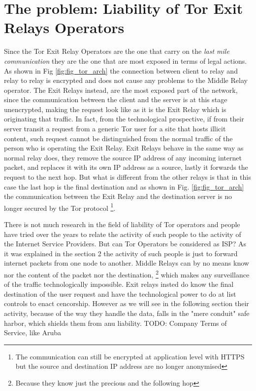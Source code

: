 \documentclass[runningheads,a4paper]{llncs}
\begin{document}
\section{The problem: Liability of Tor Exit Relays Operators}
Since the Tor Exit Relay Operators are the one that carry on the \textit{last mile communication} they are the one that are most exposed in terms of legal actions.
As shown in Fig \ref{fig:fig_tor_arch} the connection between client to relay and relay to relay is encrypted
and does not cause any problems to the Middle Relay operator. The Exit Relays instead, are the most exposed part of the network, since the communication between
the client and the server is at this stage unencrypted, making the request look like as it is the 
Exit Relay which is originating that traffic. 
In fact, from the technological prospective, if from their server transit a request from a generic Tor user for a site that hosts illicit content, such request cannot be distinguished from the normal traffic of the person who is operating the Exit Relay. 
Exit Relays behave in the same way as normal relay does, they remove the source IP address of any incoming internet packet, and replaces it with its own IP address as a source, lastly it forwards the request to the next hop. But what is different from the other relays is that in this case the last hop is the final destination and as shown in Fig. \ref{fig:fig_tor_arch} the communication between the Exit Relay and the destination server is no longer secured by the Tor protocol \footnote{The communication can still be encrypted at application level with HTTPS but the source and destination IP address are no longer anonymised}. 

There is not much research in the field of liability of Tor operators and people have tried over the years to relate the activity of such people to the activity of the Internet Service Providers. But can Tor Operators be considered as ISP?
As it was explained in the section 2 the activity of such people is just to forward internet packets from one node to another. Middle Relays can by no means know nor the content of the packet nor the destination, 
\footnote{Because they know just the precious and the following hop}
which makes any surveillance  of the traffic technologically impossible. Exit relays insted do know the final destination of the user request and have the technological power to do at list controls to enact cencorship. However as we will see in the following section their activity, because of the way they handle the data, falls in the "mere conduit" safe harbor, which shields them from anu liability. 
TODO: Company Terms of Service, like Aruba
\end{document}
